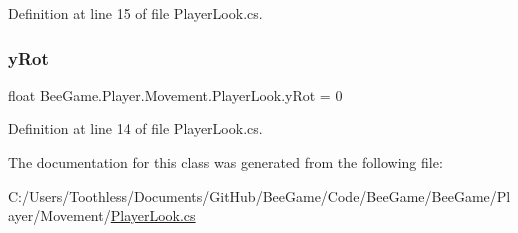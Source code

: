 Definition at line 15 of file Player\+Look.\+cs.

\mbox{\label{class_bee_game_1_1_player_1_1_movement_1_1_player_look_a3eb9d7e0aad01bed50a29e2ae00b24d6}} 
\subsubsection{\texorpdfstring{y\+Rot}{yRot}}
{\footnotesize\ttfamily float Bee\+Game.\+Player.\+Movement.\+Player\+Look.\+y\+Rot = 0\hspace{0.3cm}{\ttfamily [private]}}



Definition at line 14 of file Player\+Look.\+cs.



The documentation for this class was generated from the following file\+:\begin{DoxyCompactItemize}
\item 
C\+:/\+Users/\+Toothless/\+Documents/\+Git\+Hub/\+Bee\+Game/\+Code/\+Bee\+Game/\+Bee\+Game/\+Player/\+Movement/\hyperlink{_player_look_8cs}{Player\+Look.\+cs}\end{DoxyCompactItemize}
